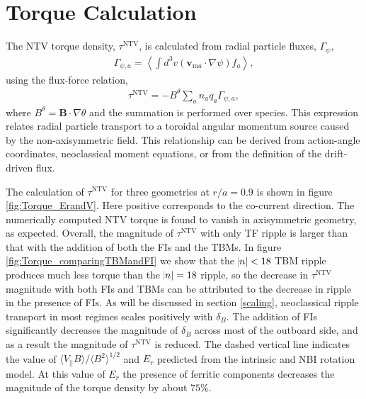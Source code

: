 \documentclass[aip, pop, preprint]{revtex4-1}
\numberwithin{figure}{section}
\numberwithin{equation}{section}
\begin{document}
\FloatBarrier

\section{Torque Calculation}\label{torque}

The NTV torque density, $\tau^{\mathrm{NTV}}$, is calculated from radial particle fluxes, $\Gamma_{\psi}$, 
\begin{gather}
\Gamma_{\psi,a} = \left \langle \int d^3v (\bm{v}_{\mathrm{m}a} \cdot \nabla \psi) f_a \right \rangle,
\label{eq:particleflux}
\end{gather}
using the flux-force relation,
\begin{gather}
\tau^{\mathrm{NTV}} = - B^{\theta} \sum_a n_a q_a \Gamma_{\psi, a},
\end{gather}
where $B^{\theta} = \bm{B} \cdot \nabla \theta$ and the summation is performed over species. This expression relates radial particle transport to a toroidal angular momentum source caused by the non-axisymmetric field. This relationship can be derived from action-angle coordinates,\cite{Albert2016} neoclassical moment equations,\cite{Shaing1986} or from the definition of the drift-driven flux.\cite{Shaing2006} 

The calculation of $\tau^{\mathrm{NTV}}$ for three geometries at $r/a = 0.9$ is shown in figure \ref{fig:Torque_ErandV}. Here positive corresponds to the co-current direction. The numerically computed NTV torque is found to vanish in axisymmetric geometry, as expected. Overall, the magnitude of $\tau^{\mathrm{NTV}}$ with only TF ripple is larger than that with the addition of both the FIs and the TBMs.  In figure \ref{fig:Torque_comparingTBMandFI} we show that the $\abs{n} < 18$ TBM  ripple produces much less torque than the $\abs{n} = 18$ ripple, so the decrease in $\tau^{\mathrm{NTV}}$ magnitude with both FIs and TBMs can be attributed to the decrease in ripple in the presence of FIs. As will be discussed in section \ref{scaling}, neoclassical ripple transport in most regimes scales positively with $\delta_B$. The addition of FIs significantly decreases the magnitude of $\delta_B$ across most of the outboard side, and as a result the magnitude of $\tau^{\mathrm{NTV}}$ is reduced. The dashed vertical line indicates the value of $\langle V_{||} B\rangle/\langle B^2 \rangle^{1/2}$ and $E_r$ predicted from the intrinsic and NBI rotation model. At this value of $E_r$ the presence of ferritic components decreases the magnitude of the torque density by about $75\%$. 
\end{document}
